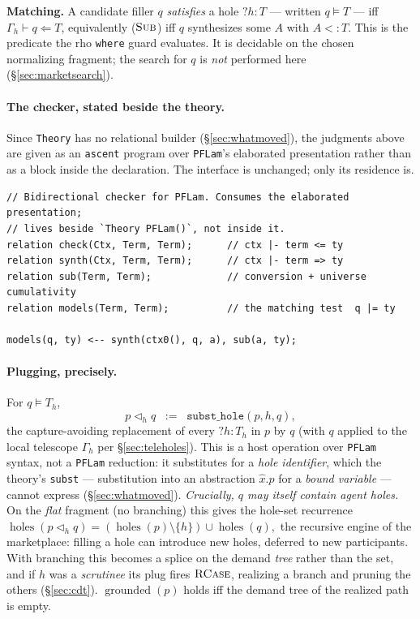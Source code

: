 \documentclass[11pt]{article}
\newcommand{\rul}[1]{\ensuremath{\textsc{#1}}}
\newcommand{\hole}[2]{\ensuremath{?#1\!:\!#2}}
\newcommand{\plug}{\mathbin{\triangleleft}}
\newcommand{\sat}{\models}
\newcommand{\subt}{\mathrel{<:}}
\newcommand{\tele}{\Gamma}
\newcommand{\Holes}{\ensuremath{\operatorname{holes}}}
\newcommand{\grounded}{\ensuremath{\operatorname{grounded}}}
\newcommand{\code}[1]{\lstinline[language=rho,basicstyle=\ttfamily\small]|#1|}
\begin{document}
\noindent
\textbf{Matching.} A candidate filler $q$ \emph{satisfies} a hole $\hole{h}{T}$ --- written
$q \sat T$ --- iff $\tele_h \vdash q \Leftarrow T$, equivalently (\rul{Sub}) iff $q$ synthesizes some
$A$ with $A \subt T$. This is the predicate the rho \code{where} guard evaluates. It is decidable on
the chosen normalizing fragment; the search for $q$ is \emph{not} performed here (\S\ref{sec:marketsearch}).

\paragraph{The checker, stated beside the theory.} Since \texttt{Theory} has no relational builder
(\S\ref{sec:whatmoved}), the judgments above are given as an \texttt{ascent} program over
\texttt{PFLam}'s elaborated presentation rather than as a block inside the declaration. The
interface is unchanged; only its residence is.

\begin{lstlisting}[language=mettail]
// Bidirectional checker for PFLam. Consumes the elaborated presentation;
// lives beside `Theory PFLam()`, not inside it.
relation check(Ctx, Term, Term);      // ctx |- term <= ty
relation synth(Ctx, Term, Term);      // ctx |- term => ty
relation sub(Term, Term);             // conversion + universe cumulativity
relation models(Term, Term);          // the matching test  q |= ty

models(q, ty) <-- synth(ctx0(), q, a), sub(a, ty);
\end{lstlisting}

\paragraph{Plugging, precisely.} For $q \sat T_h$,
\[
  p \plug_h q \;\;:=\;\; \mathtt{subst\_hole}(p, h, q),
\]
the capture-avoiding replacement of every $\hole{h}{T_h}$ in $p$ by $q$ (with $q$ applied to the local
telescope $\tele_h$ per \S\ref{sec:teleholes}). This is a host operation over \texttt{PFLam} syntax,
not a \texttt{PFLam} reduction: it substitutes for a \emph{hole identifier}, which the theory's
\lstinline[language=mettail,basicstyle=\ttfamily\small]|subst| --- substitution into an abstraction
$\hat{x}.p$ for a \emph{bound variable} --- cannot express (\S\ref{sec:whatmoved}). \emph{Crucially, $q$ may itself contain agent holes.}
On the \emph{flat} fragment (no branching) this gives the hole-set recurrence
\(
  \Holes(p \plug_h q) = (\Holes(p)\setminus\{h\}) \cup \Holes(q),
\)
the recursive engine of the marketplace: filling a hole can introduce new holes, deferred to new
participants. With branching this becomes a splice on the demand \emph{tree} rather than the set, and
if $h$ was a \emph{scrutinee} its plug fires \rul{RCase}, realizing a branch and pruning the others
(\S\ref{sec:cdt}). $\grounded(p)$ holds iff the demand tree of the realized path is empty.
\end{document}
